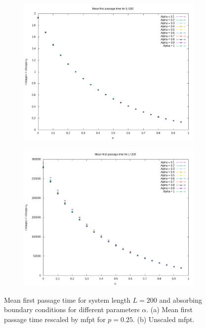 \documentclass[]{scrartcl}
\begin{document}
 \begin{figure}[!hbt]
\centering
\begin{subfigure}{0.45\textwidth}
 \includegraphics[width=\textwidth]{./fig/alpha/L=200/fpt.png}
\end{subfigure}
\begin{subfigure}{0.45\textwidth}
 \includegraphics[width=\textwidth]{./fig/alpha/L=200/fpt2.png}
\end{subfigure}
\caption{Mean first passage time for system length $L = 200$ and absorbing boundary conditions for different parameters $\alpha$. (a) Mean first passage time rescaled by mfpt for $p = 0.25$. (b) Unscaled mfpt.} 
\label{fig:alpha-fpts200}
\end{figure}
\end{document}
